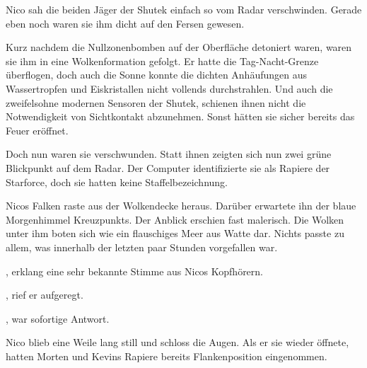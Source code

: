 Nico sah die beiden Jäger der Shutek einfach so vom Radar verschwinden. Gerade eben noch waren sie ihm dicht auf den Fersen gewesen.

\par

Kurz nachdem die Nullzonenbomben auf der Oberfläche detoniert waren, waren sie ihm in eine Wolkenformation gefolgt. Er hatte die Tag-Nacht-Grenze überflogen, doch auch die Sonne konnte die dichten Anhäufungen aus Wassertropfen und Eiskristallen nicht vollends durchstrahlen. Und auch die zweifelsohne modernen Sensoren der Shutek, schienen ihnen nicht die Notwendigkeit von Sichtkontakt abzunehmen. Sonst hätten sie sicher bereits das Feuer eröffnet.

\par

Doch nun waren sie verschwunden. Statt ihnen zeigten sich nun zwei grüne Blickpunkt auf dem Radar. Der Computer identifizierte sie als Rapiere der Starforce, doch sie hatten keine Staffelbezeichnung.

\par

Nicos Falken raste aus der Wolkendecke heraus. Darüber erwartete ihn der blaue Morgenhimmel Kreuzpunkts. Der Anblick erschien fast malerisch. Die Wolken unter ihm boten sich wie ein flauschiges Meer aus Watte dar. Nichts passte zu allem, was innerhalb der letzten paar Stunden vorgefallen war.

\par

, erklang eine sehr bekannte Stimme aus Nicos Kopfhörern.

\par

, rief er aufgeregt.

\par

, war sofortige Antwort. 

\par

Nico blieb eine Weile lang still und schloss die Augen. Als er sie wieder öffnete, hatten Morten und Kevins Rapiere bereits Flankenposition eingenommen. 

\par

